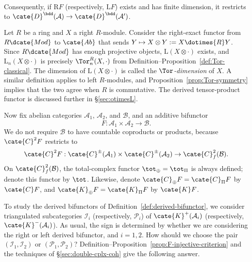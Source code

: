 Consequently, if $\mathrm{R}F$ (respectively, $\mathrm{L}F$) exists and has
finite dimension, it restricts to
$\cate{D}^{\bdd}(\mathcal{A})\to\cate{D}^{\bdd}(\mathcal{A}')$.

\begin{example}\label{eg:Tor-dimension}
	Let $R$ be a ring and $X$ a right $R$-module. Consider the right-exact
	functor from $R\dcate{Mod}$ to $\cate{Ab}$ that sends
	$Y\mapsto X\otimes Y:=X\dotimes{R}Y$. Since $R\dcate{Mod}$ has enough
	projective objects, $\mathrm{L}(X\otimes\cdot)$ exists, and
	$\mathrm{L}_n(X\otimes\cdot)$ is precisely
	$\Tor^R_n(X,\cdot)$ from
	Definition--Proposition~\ref{def:Tor-classical}. The dimension of
	$\mathrm{L}(X\otimes\cdot)$ is called the \emph{$\Tor$-dimension} of
	$X$. A similar definition applies to left $R$-modules, and
	Proposition~\ref{prop:Tor-symmetry} implies that the two agree when $R$ is
	commutative. The derived tensor-product functor is discussed further in
	\S\ref{sec:otimesL}.
\end{example}

Now fix abelian categories $\mathcal{A}_1$, $\mathcal{A}_2$, and
$\mathcal{B}$, and an additive bifunctor
\[ F: \mathcal{A}_1 \times \mathcal{A}_2 \to \mathcal{B}. \]
We do not require $\mathcal{B}$ to have countable coproducts or products,
because $\cate{C}^2F$ restricts to
\begin{gather*}
	\cate{C}^2 F: \cate{C}^{\pm}(\mathcal{A}_1) \times \cate{C}^{\pm} (\mathcal{A}_2) \to \cate{C}^2_f(\mathcal{B}).
\end{gather*}
On $\cate{C}^2_f(\mathcal{B})$, the total-complex functor
$\tot_{\oplus}=\tot_{\Pi}$ is always defined; denote this functor by
$\tot$. Likewise, denote $\cate{C}_{\oplus}F=\cate{C}_{\Pi}F$ by
$\cate{C}F$, and $\cate{K}_{\oplus}F=\cate{K}_{\Pi}F$ by $\cate{K}F$.

To study the derived bifunctors of Definition~\ref{def:derived-bifunctor}, we
consider triangulated subcategories $\mathcal{I}_i$ (respectively,
$\mathcal{P}_i$) of $\cate{K}^+(\mathcal{A}_i)$ (respectively,
$\cate{K}^-(\mathcal{A}_i)$). As usual, the sign is determined by whether we
are considering the right or left derived bifunctor, and $i=1,2$. How should
we choose the pair $(\mathcal{I}_1,\mathcal{I}_2)$ or
$(\mathcal{P}_1,\mathcal{P}_2)$?
Definition--Proposition~\ref{prop:F-injective-criterion} and the techniques of
\S\ref{sec:double-cplx-coh} give the following answer.

